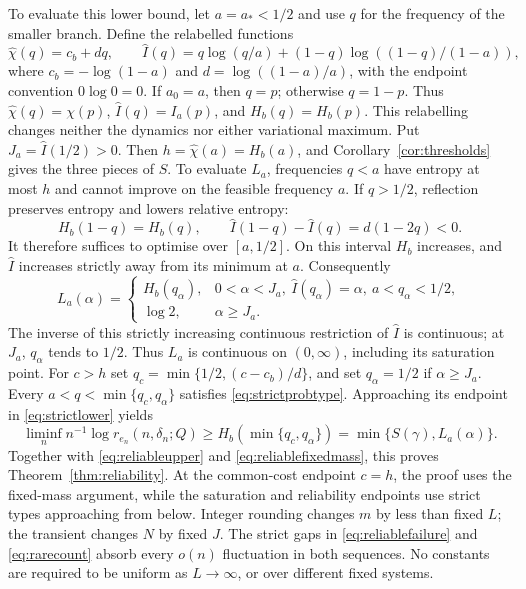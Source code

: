 \documentclass[11pt]{amsart}
\theoremstyle{definition}
\theoremstyle{remark}
\numberwithin{equation}{section}
\begin{document}
To evaluate this lower bound, let $a=a_*<1/2$ and use $q$ for
the frequency of the smaller branch. Define the relabelled functions
\[
\widehat\chi(q)=c_b+dq,\qquad
\widehat I(q)=q\log(q/a)+(1-q)\log((1-q)/(1-a)),
\]
where $c_b=-\log(1-a)$ and $d=\log((1-a)/a)$, with the
endpoint convention $0\log0=0$. If $a_0=a$, then $q=p$;
otherwise $q=1-p$. Thus
$\widehat\chi(q)=\chi(p)$, $\widehat I(q)=I_a(p)$, and
$H_b(q)=H_b(p)$. This relabelling changes neither the dynamics
nor either variational maximum. Put $J_a=\widehat I(1/2)>0$.
Then $h=\widehat\chi(a)=H_b(a)$, and
Corollary~\ref{cor:thresholds} gives the three pieces of $S$.
To evaluate $L_a$, frequencies $q<a$ have entropy at most $h$
and cannot improve on the feasible frequency $a$. If $q>1/2$,
reflection preserves entropy and lowers relative entropy:
\[
H_b(1-q)=H_b(q),\qquad
\widehat I(1-q)-\widehat I(q)=d(1-2q)<0.
\]
It therefore suffices to optimise over $[a,1/2]$. On this interval
$H_b$ increases, and $\widehat I$ increases strictly away from
its minimum at $a$. Consequently
\begin{equation}\label{eq:reliabilityclosed}
L_a(\alpha)=
\begin{cases}
H_b(q_\alpha),&0<\alpha<J_a,\ \widehat I(q_\alpha)=\alpha,
                                      \ a<q_\alpha<1/2,\\
\log2,&\alpha\ge J_a.
\end{cases}
\end{equation}
The inverse of this strictly increasing continuous restriction of
$\widehat I$ is continuous; at $J_a$, $q_\alpha$ tends to $1/2$.
Thus $L_a$ is continuous on $(0,\infty)$, including its saturation
point.
For $c>h$ set $q_c=\min\{1/2,(c-c_b)/d\}$, and set
$q_\alpha=1/2$ if $\alpha\ge J_a$.
Every $a<q<\min\{q_c,q_\alpha\}$ satisfies
\eqref{eq:strictprobtype}. Approaching its endpoint in
\eqref{eq:strictlower} yields
\[
\liminf_n n^{-1}\log r_{e_n}(n,\delta_n;Q)
 \ge H_b(\min\{q_c,q_\alpha\})
 =\min\{S(\gamma),L_a(\alpha)\}.
\]
Together with \eqref{eq:reliableupper} and
\eqref{eq:reliablefixedmass}, this proves
Theorem~\ref{thm:reliability}. At the common-cost endpoint $c=h$, the proof
uses the fixed-mass argument, while the saturation and reliability
endpoints use strict types approaching from below. Integer rounding
changes $m$ by less than fixed $L$; the transient changes $N$ by
fixed $J$. The strict gaps in \eqref{eq:reliablefailure} and
\eqref{eq:rarecount} absorb every $o(n)$ fluctuation in both
sequences. No constants are required to be uniform as $L\to\infty$,
or over different fixed systems.
\end{document}
